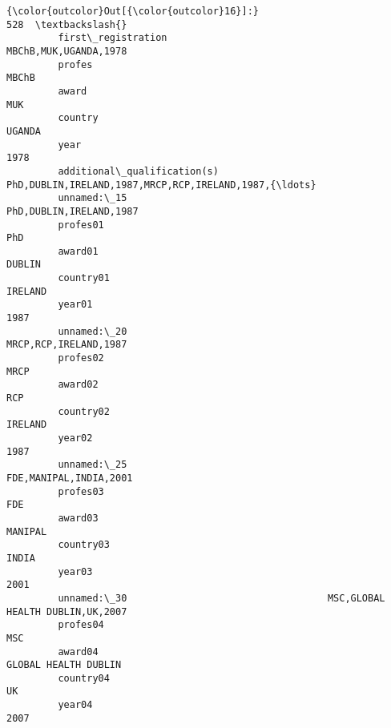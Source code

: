 \documentclass[11pt]{article}
\begin{document}
\begin{Verbatim}[commandchars=\\\{\}]
{\color{outcolor}Out[{\color{outcolor}16}]:}                                                                            528  \textbackslash{}
         first\_registration                                       MBChB,MUK,UGANDA,1978   
         profes                                                                   MBChB   
         award                                                                      MUK   
         country                                                                 UGANDA   
         year                                                                      1978   
         additional\_qualification(s)  PhD,DUBLIN,IRELAND,1987,MRCP,RCP,IRELAND,1987,{\ldots}   
         unnamed:\_15                                            PhD,DUBLIN,IRELAND,1987   
         profes01                                                                   PhD   
         award01                                                                 DUBLIN   
         country01                                                              IRELAND   
         year01                                                                    1987   
         unnamed:\_20                                              MRCP,RCP,IRELAND,1987   
         profes02                                                                  MRCP   
         award02                                                                    RCP   
         country02                                                              IRELAND   
         year02                                                                    1987   
         unnamed:\_25                                             FDE,MANIPAL,INDIA,2001   
         profes03                                                                   FDE   
         award03                                                                MANIPAL   
         country03                                                                INDIA   
         year03                                                                    2001   
         unnamed:\_30                                   MSC,GLOBAL HEALTH DUBLIN,UK,2007   
         profes04                                                                   MSC   
         award04                                                   GLOBAL HEALTH DUBLIN   
         country04                                                                   UK   
         year04                                                                    2007   
         

\end{Verbatim}
\end{document}
